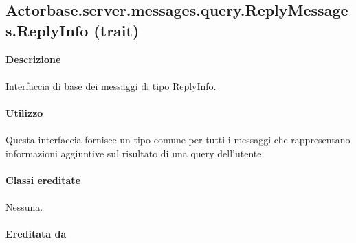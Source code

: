 \documentclass[a4paper]{article}
\begin{document}
	\subsection{Actorbase.server.messages.query.ReplyMessages.ReplyInfo (trait)}
			\textbf{Descrizione}
			\\ \\
			Interfaccia di base dei messaggi di tipo ReplyInfo.
			\\ \\
		\textbf{Utilizzo}
			\\ \\
			Questa interfaccia fornisce un tipo comune per tutti i messaggi che rappresentano informazioni aggiuntive sul risultato di una query dell'utente.
			\\ \\
		\textbf{Classi ereditate}
			\\ \\
			Nessuna.
			\\ \\
		\textbf{Ereditata da}
\end{document}
